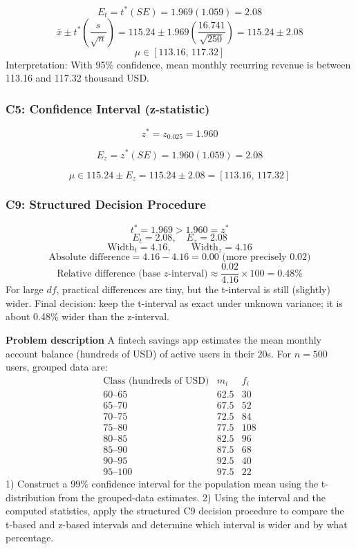 \begin{ExamProblems}
		\[
		E_t=t^*(SE)=1.969(1.059)=2.08
		\]
		\[
		\bar{x}\pm t^*\left(\frac{s}{\sqrt{n}}\right)=115.24\pm 1.969\left(\frac{16.741}{\sqrt{250}}\right)=115.24\pm 2.08
		\]
		\[
		\mu\in[113.16,\,117.32]
		\]
		Interpretation: With 95\% confidence, mean monthly recurring revenue is between 113.16 and 117.32 thousand USD.

		\subsubsection*{C5: Confidence Interval (z-statistic)}
		\[
		z^*=z_{0.025}=1.960
		\]

		\[
		E_z=z^*(SE)=1.960(1.059)=2.08
		\]

		\[
		\mu\in 115.24\pm E_z=115.24\pm 2.08=[113.16,\,117.32]
		\]

		\subsubsection*{C9: Structured Decision Procedure}
		\[
		t^*=1.969>1.960=z^*
		\]
		\[
		E_t=2.08,\quad E_z=2.08
		\]
		\[
		\text{Width}_t=4.16,\qquad \text{Width}_z=4.16
		\]
		\[
		\text{Absolute difference}=4.16-4.16=0.00\text{ (more precisely }0.02\text{)}
		\]
		\[
		\text{Relative difference (base }z\text{-interval)}\approx\frac{0.02}{4.16}\times 100=0.48\%
		\]
		For large $df$, practical differences are tiny, but the t-interval is still (slightly) wider.
		Final decision: keep the t-interval as exact under unknown variance; it is about 0.48\% wider than the z-interval.

		\newpage
		\item
		\textbf{Problem description}
		A fintech savings app estimates the mean monthly account balance (hundreds of USD) of active users in their 20s.
		For $n=500$ users, grouped data are:
		\[
		\begin{array}{c|c|c}
		\text{Class (hundreds of USD)} & m_i & f_i\\\hline
		60\text{--}65 & 62.5 & 30\\
		65\text{--}70 & 67.5 & 52\\
		70\text{--}75 & 72.5 & 84\\
		75\text{--}80 & 77.5 & 108\\
		80\text{--}85 & 82.5 & 96\\
		85\text{--}90 & 87.5 & 68\\
		90\text{--}95 & 92.5 & 40\\
		95\text{--}100 & 97.5 & 22
		\end{array}
		\]
		1) Construct a 99\% confidence interval for the population mean using the t-distribution from the grouped-data estimates.
		2) Using the interval and the computed statistics, apply the structured C9 decision procedure to compare the t-based and z-based intervals and determine which interval is wider and by what percentage.


\end{ExamProblems}
